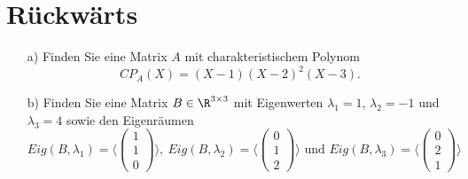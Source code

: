 
\section{Rückwärts}
\begin{itemize}
\item[a)] Finden Sie eine Matrix $A$ mit charakteristischem Polynom 
$$CP_A(X)=(X-1)(X-2)^2(X-3).$$
\item[b)] Finden Sie eine Matrix $B \in \R^{3\times 3}$ mit Eigenwerten $\lambda_1= 1$, $\lambda_2=-1$ und $\lambda_3=4$ sowie den Eigenräumen
$$
Eig(B,\lambda_1)=\langle \begin{pmatrix} 1 \\ 1 \\ 0 \end{pmatrix} \rangle, \ Eig(B,\lambda_2)=\langle \begin{pmatrix} 0 \\ 1 \\ 2 \end{pmatrix} \rangle \text{ und } Eig(B,\lambda_3)=\langle \begin{pmatrix} 0 \\ 2 \\ 1 \end{pmatrix} \rangle
$$
\end{itemize}






